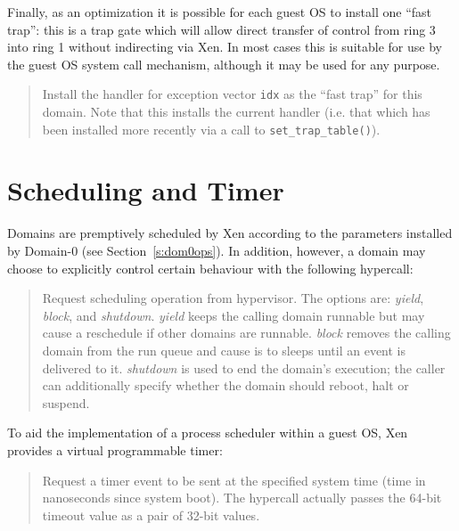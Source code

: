 \documentclass[11pt,twoside,final,openright]{xenstyle}
\begin{document}
Finally, as an optimization it is possible for each guest OS 
to install one ``fast trap'': this is a trap gate which will 
allow direct transfer of control from ring 3 into ring 1 without
indirecting via Xen. In most cases this is suitable for use by 
the guest OS system call mechanism, although it may be used for
any purpose. 


\begin{quote}

Install the handler for exception vector {\tt idx} as the ``fast
trap'' for this domain. Note that this installs the current handler 
(i.e. that which has been installed more recently via a call 
to {\tt set\_trap\_table()}). 

\end{quote}



\section{Scheduling and Timer}

Domains are premptively scheduled by Xen according to the 
parameters installed by Domain-0 (see Section~\ref{s:dom0ops}). 
In addition, however, a domain may choose to explicitly 
control certain behaviour with the following hypercall: 

\begin{quote} 

Request scheduling operation from hypervisor. The options are: {\it
yield}, {\it block}, and {\it shutdown}.  {\it yield} keeps the
calling domain runnable but may cause a reschedule if other domains
are runnable.  {\it block} removes the calling domain from the run
queue and cause is to sleeps until an event is delivered to it.  {\it
shutdown} is used to end the domain's execution; the caller can
additionally specify whether the domain should reboot, halt or
suspend.
\end{quote} 

To aid the implementation of a process scheduler within a guest OS,
Xen provides a virtual programmable timer:

\begin{quote}

Request a timer event to be sent at the specified system time (time 
in nanoseconds since system boot). The hypercall actually passes the 
64-bit timeout value as a pair of 32-bit values. 

\end{quote} 
\end{document}
